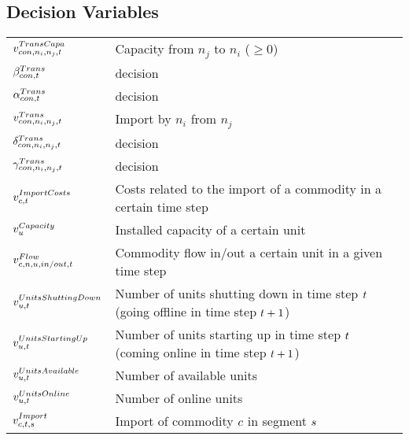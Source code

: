\subsection*{Decision Variables}
\vspace{-1em}
	\begin{longtable}{p{\cola} p{\colc} >{\small\raggedleft\arraybackslash\itshape}p{\colb}}
		$v^{TransCapa}_{{con},n_i,n_j,t}     $	& Capacity from $n_j$ to $n_i$  ($\geq 0$)                              	&                \\
		$\beta^{Trans}_{{con},t}            $	& decision                                                    	&                \\
		$\alpha^{Trans}_{{con},t}            $	& decision                                                    	&                \\
		$v^{Trans}_{{con},n_i,n_j,t}        $	& Import by $n_i$ from $n_j$                                  	&                \\
		$\delta^{Trans}_{{con},n_i,n_j,t}            $	& decision                                                    	&                \\
		$\gamma^{Trans}_{{con},n_i,n_j,t}            $	& decision                                                    	&                \\[0.5em]

		$v^{ImportCosts}_{c,t}  $	& Costs related to the import of a commodity in a certain time step	&                \\[0.5em]

		$v^{Capacity}_{u}     $	& Installed capacity of a certain unit                        	&                \\[0.5em]

		$v^{Flow}_{c,n, u,in/out,t}         $	& Commodity flow in/out a certain unit in a given time step   	&                \\
		$v^{UnitsShuttingDown}_{u,t}$	& Number of units shutting down in time step $t$ (going offline in time step $t +1$)	&                \\
		$v^{UnitsStartingUp}_{u,t}$	& Number of units starting up in time step $t$ (coming online in time step $t +1$)	&                \\
		$v^{UnitsAvailable}_{u,t}$	& Number of available units                                   	&                \\
		$v^{UnitsOnline}_{u,t}  $	& Number of online units                                      	&                \\
		$v^{Import}_{c,t,s}       $	& Import of commodity $c$ in segment $s$      	&                \\
	\end{longtable}
